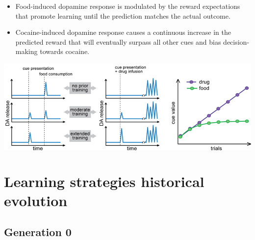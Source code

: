 \begin{casestudy}
    \phantom{}
    \begin{itemize}
        \item Food-induced dopamine response is modulated by the reward expectations that promote learning until the prediction matches the actual outcome.
        \item Cocaine-induced dopamine response causes a continuous increase in the predicted reward that
            will eventually surpass all other cues and bias decision-making towards cocaine.
    \end{itemize}
    \begin{center}
        \includegraphics[width=0.8\linewidth]{./img/dopamine_food_cocaine.png}
    \end{center}
\end{casestudy}



\section{Learning strategies historical evolution}


    


\subsection{Generation 0}

